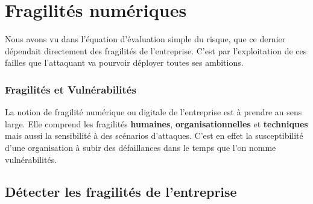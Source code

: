 
\section{Fragilités numériques}

Nous avons vu dans l'équation d'évaluation simple du risque, que ce dernier dépendait directement des fragilités de l'entreprise. C'est par l'exploitation de ces failles que l'attaquant va pourvoir déployer toutes ses ambitions.

\begin{frame}
\frametitle<presentation>{Fragilités et Vulnérabilités}
La notion de fragilité numérique ou digitale de l'entreprise est à prendre au sens large. Elle comprend les fragilités \textbf{humaines}, \textbf{organisationnelles} et \textbf{techniques} mais aussi la sensibilité à des scénarios d'attaques. C'est en effet la susceptibilité d’une organisation à subir des défaillances dans le temps que l'on nomme vulnérabilités.
\end{frame}

\subsection{Détecter les fragilités de l’entreprise}


